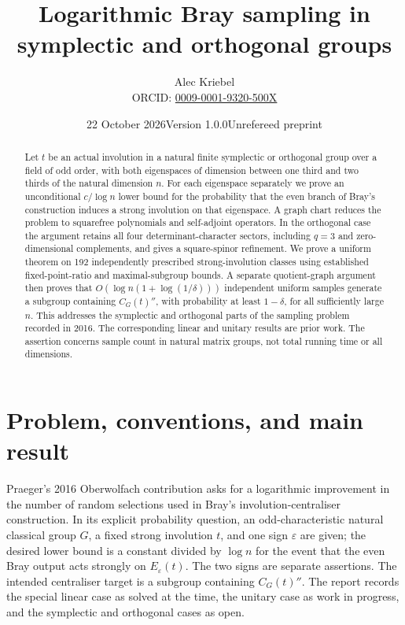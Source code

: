 \documentclass[11pt]{article}
\title{Logarithmic Bray sampling in symplectic and orthogonal groups}
\author{Alec Kriebel\\\small ORCID: \href{https://orcid.org/0009-0001-9320-500X}{0009-0001-9320-500X}}
\date{22 October 2026\quad Version 1.0.0\quad Unrefereed preprint}
\newcommand{\eps}{\varepsilon}
\begin{document}
\maketitle
\begin{abstract}
Let $t$ be an actual involution in a natural finite symplectic or orthogonal group over a field of odd order, with both eigenspaces of dimension between one third and two thirds of the natural dimension $n$. For each eigenspace separately we prove an unconditional $c/\log n$ lower bound for the probability that the even branch of Bray's construction induces a strong involution on that eigenspace. A graph chart reduces the problem to squarefree polynomials and self-adjoint operators. In the orthogonal case the argument retains all four determinant-character sectors, including $q=3$ and zero-dimensional complements, and gives a square-spinor refinement. We prove a uniform theorem on 192 independently prescribed strong-involution classes using established fixed-point-ratio and maximal-subgroup bounds. A separate quotient-graph argument then proves that $O(\log n(1+\log(1/\delta)))$ independent uniform samples generate a subgroup containing $C_G(t)''$, with probability at least $1-\delta$, for all sufficiently large $n$. This addresses the symplectic and orthogonal parts of the sampling problem recorded in 2016. The corresponding linear and unitary results are prior work. The assertion concerns sample count in natural matrix groups, not total running time or all dimensions.
\end{abstract}

\section{Problem, conventions, and main result}
Praeger's 2016 Oberwolfach contribution \cite[pp.~2160--2161]{owr} asks for a logarithmic improvement in the number of random selections used in Bray's involution-centraliser construction. In its explicit probability question, an odd-characteristic natural classical group $G$, a fixed strong involution $t$, and one sign $\eps$ are given; the desired lower bound is a constant divided by $\log n$ for the event that the even Bray output acts strongly on $E_\eps(t)$. The two signs are separate assertions. The intended centraliser target is a subgroup containing $C_G(t)''$. The report records the special linear case as solved at the time, the unitary case as work in progress, and the symplectic and orthogonal cases as open.
\end{document}
